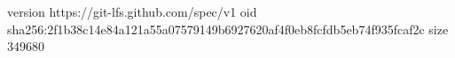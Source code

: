 version https://git-lfs.github.com/spec/v1
oid sha256:2f1b38c14e84a121a55a07579149b6927620af4f0eb8fcfdb5eb74f935fcaf2c
size 349680
